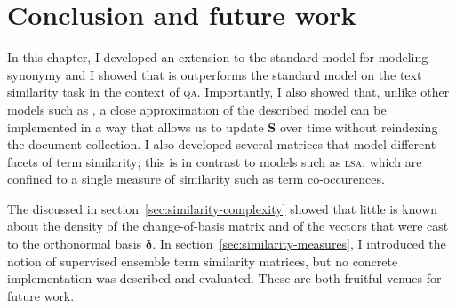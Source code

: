 \documentclass[
  digital, %
  notable, %
  lof,     %
  lot,     %
  nopalatino, color
]{fithesis3}
\def\abbr#1{\textsc{\MakeLowercase{#1}}}
\begin{document}
\section{Conclusion and future work}
\label{sec:similarity-conclusion}
In this chapter, I developed an extension to the standard model for modeling synonymy and I showed that is outperforms the standard
model on the text similarity task in the context of \abbr{QA}. Importantly, I
also showed that, unlike other models such as \index{LSA@\abbr{LSA}}, a close
approximation of the described model can be implemented in a way that allows us
to update $\mathbf S$ over time without reindexing the
document collection. I also developed several matrices that model different
facets of term similarity; this is in contrast to models such as \abbr{LSA},
which are confined to a single measure of similarity such as term
co-occurences.

The discussed in section~\ref{sec:similarity-complexity} showed that little is
known about the density of the change-of-basis matrix 
and of the vectors that were cast to the orthonormal basis
$\bm\delta$. In section~\ref{sec:similarity-measures}, I
introduced the notion of supervised ensemble term similarity matrices, but no
concrete implementation was described and evaluated. These are both fruitful
venues for future work.

\FloatBarrier
\end{document}
